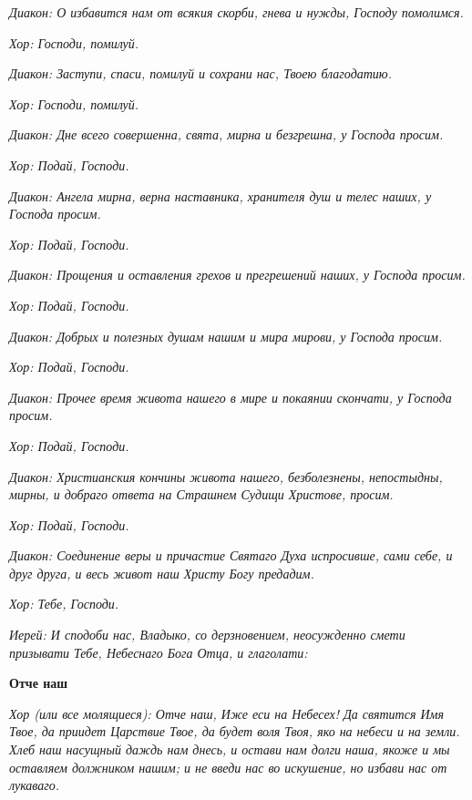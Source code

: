  \itshape Диакон:\normalfont{} О избавится нам от всякия скорби, гнева и нужды, Господу
помолимся.


 \itshape Хор:\normalfont{} Господи, помилуй.


 \itshape Диакон:\normalfont{} Заступи, спаси, помилуй и сохрани нас, Твоею благодатию.


 \itshape Хор:\normalfont{} Господи, помилуй.


 \itshape Диакон:\normalfont{} Дне всего совершенна, свята, мирна и безгрешна, у Господа
просим.


 \itshape Хор:\normalfont{} Подай, Господи.


 \itshape Диакон:\normalfont{} Ангела мирна, верна наставника, хранителя душ и телес наших,
у Господа просим.


 \itshape Хор:\normalfont{} Подай, Господи.


 \itshape Диакон:\normalfont{} Прощения и оставления грехов и прегрешений наших, у Господа
просим.


 \itshape Хор:\normalfont{} Подай, Господи.


 \itshape Диакон:\normalfont{} Добрых и полезных душам нашим и мира мирови, у Господа
просим.


 \itshape Хор:\normalfont{} Подай, Господи.


 \itshape Диакон:\normalfont{} Прочее время живота нашего в мире и покаянии скончати, у
Господа просим.


 \itshape Хор:\normalfont{} Подай, Господи.


 \itshape Диакон:\normalfont{} Христианския кончины живота нашего, безболезнены,
непостыдны, мирны, и добраго ответа на Страшнем Судищи Христове,
просим.


 \itshape Хор:\normalfont{} Подай, Господи.


 \itshape Диакон:\normalfont{} Соединение веры и причастие Святаго Духа испросивше, сами
себе, и друг друга, и весь живот наш Христу Богу предадим.


 \itshape Хор:\normalfont{} Тебе, Господи.


 \itshape Иерей:\normalfont{} И сподоби нас, Владыко, со дерзновением, неосужденно смети
призывати Тебе, Небеснаго Бога Отца, и глаголати:




 

\bfseries  Отче наш\normalfont{}


 \itshape Хор (или все молящиеся):\normalfont{} Отче наш, Иже еси на Небесех! Да святится
Имя Твое, да приидет Царствие Твое, да будет воля Твоя, яко на небеси и на
земли. Хлеб наш насущный даждь нам днесь, и остави нам долги наша,
якоже и мы оставляем должником нашим; и не введи нас во искушение, но
избави нас от лукаваго.


